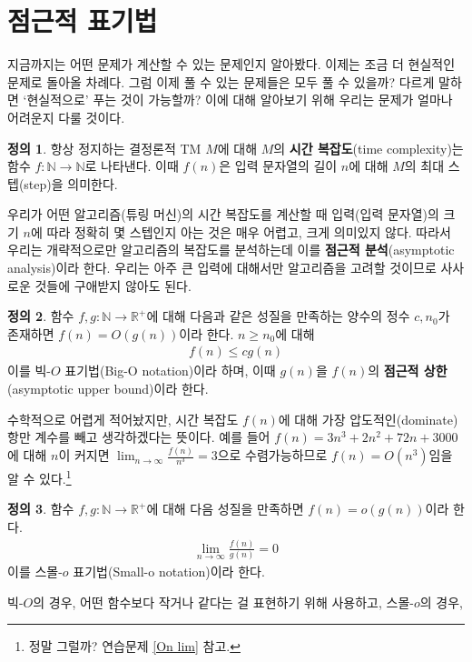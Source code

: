 \documentclass[b5paper, 11pt]{book}
\theoremstyle{definition}
\newtheorem{defn}{정의}[chapter]
\begin{document}
\section{점근적 표기법}\label{asymptotic}
지금까지는 어떤 문제가 계산할 수 있는 문제인지 알아봤다. 이제는 조금 더 현실적인 문제로 돌아올 차례다. 그럼 이제 풀 수 있는 문제들은 모두 풀 수 있을까? 다르게 말하면 `현실적으로' 푸는 것이 가능할까? 이에 대해 알아보기 위해 우리는 문제가 얼마나 어려운지 다룰 것이다.
\begin{defn}
    항상 정지하는 결정론적 TM $M$에 대해 $M$의 \textbf{시간 복잡도}(time complexity)는 함수 $f:
    \mathbb{N} \rightarrow \mathbb{N}$로 나타낸다. 이때 $f(n)$은 입력 문자열의 길이 $n$에 대해
    $M$의 최대 스텝(step)을 의미한다.
\end{defn}
우리가 어떤 알고리즘(튜링 머신)의 시간 복잡도를 계산할 때 입력(입력 문자열)의 크기 $n$에 따라 정확히
몇 스텝인지 아는 것은 매우 어렵고, 크게 의미있지 않다. 따라서 우리는 
개략적으로만 알고리즘의 복잡도를 분석하는데
이를 \textbf{점근적 분석}(asymptotic analysis)이라 한다. 우리는 아주 큰 입력에 
대해서만 알고리즘을 고려할 것이므로
사사로운 것들에 구애받지 않아도 된다. 
\begin{defn} \label{big-o defn}
    함수 $f, g : \mathbb{N} \rightarrow \mathbb{R}^{+}$에 대해 다음과 같은 성질을 만족하는 
    양수의 정수 $c, n_0$가 존재하면 $f(n) = O(g(n))$이라 한다. $n \ge n_0$에 대해
    \begin{align*}
        f(n) \le cg(n)
    \end{align*}
    이를 빅-$O$ 표기법(Big-O notation)이라 하며, 
    이때 $g(n)$을 $f(n)$의 \textbf{점근적 상한} (asymptotic upper bound)이라 한다.
\end{defn}
수학적으로 어렵게 적어놨지만, 시간 복잡도 $f(n)$에 대해 가장 압도적인(dominate) 항만 계수를 빼고
 생각하겠다는 뜻이다.
예를 들어 $f(n) = 3n^3 + 2n^2 +72n + 3000$에 대해 $n$이 커지면 $\lim_{n \rightarrow \infty} 
\frac{f(n)}{n^3} = 3$으로 수렴가능하므로 $f(n) = O(n^3)$임을 알 수 있다.\footnote{정말 그럴까?
연습문제 \ref{On lim} 참고.}
\begin{defn}\label{small-o defn}
    함수 $f,g : \mathbb{N} \rightarrow \mathbb{R}^{+}$에 대해 다음 성질을 만족하면
    $f(n) = o(g(n))$이라 한다. 
    \begin{align*}
        \lim_{n\rightarrow \infty} \frac{f(n)}{g(n)} = 0
    \end{align*}
    이를 스몰-$o$ 표기법(Small-o notation)이라 한다. 
\end{defn}
빅-$O$의 경우, 어떤 함수보다 작거나 같다는 걸 표현하기 위해 사용하고, 스몰-$o$의 경우,
\end{document}
